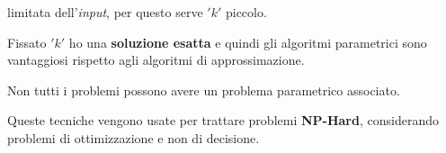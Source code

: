 										limitata dell'\textit{input}, per questo serve $ 'k' $ piccolo.\\
										\begin{nota}
											Fissato $ 'k' $ ho una \textbf{soluzione esatta} e quindi gli algoritmi parametrici
											sono vantaggiosi rispetto agli algoritmi di approssimazione.\\
										\end{nota}
										\begin{nota}
											Non tutti i problemi possono avere un problema parametrico associato.
										\end{nota}
										\begin{nota}
											Queste tecniche vengono usate per trattare problemi \textbf{NP-Hard},
											considerando problemi di ottimizzazione e non di decisione.
										\end{nota}
